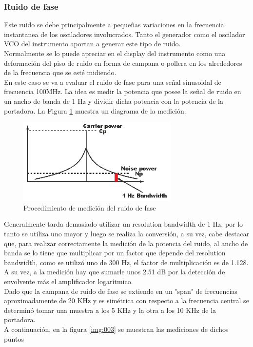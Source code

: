 \documentclass[a4paper,10pt]{article}
\begin{document}
		\subsubsection{Ruido de fase}
		\indent Este ruido se debe principalmente a peque\~nas variaciones en la frecuencia instantanea de 
		los osciladores involucrados. Tanto el generador como el oscilador VCO 
		del instrumento aportan a generar este tipo de ruido. \\
		\indent Normalmente se lo puede apreciar en el display del instrumento 
		como una deformaci\'on del piso de ruido en forma de campana o pollera 
		en los alrededores de la frecuencia que se est\'e midiendo. \\
		\indent En este caso se va a evaluar el ruido de fase para una se\~nal
		sinusoidal de frecuencia 100MHz. La idea es medir la potencia que posee 
		la se\~nal de ruido en un ancho de banda de 1 Hz y dividir dicha 
		potencia con la potencia de la portadora. La Figura \ref{img:002} 
		muestra un diagrama de la medici\'on. 

		\begin{figure}[!htb]
			\centering
			\includegraphics[width=8cm]
			{Imagenes/PhaseNoiseMeasurement.png}
			\caption{Procedimiento de medici\'on del ruido de fase}
			\label{img:002} 
		\end{figure}

		\indent Generalmente tarda demasiado utilizar un resolution bandwidth de
		1 Hz, por lo tanto se utiliza uno mayor y luego se realiza la 
		conversi\'on, a su vez, cabe destacar que, para realizar correctamente 
		la medici\'on de la potencia del ruido, al ancho de banda se lo tiene 
		que multiplicar por un factor que depende del resolution bandwidth, como
		se utiliz\'o uno de 300 Hz, el factor de multiplicaci\'on es de 1.128.\\
		\indent A su vez, a la medici\'on hay que sumarle unos 2.51 dB por la 
		detecci\'on de envolvente m\'as el amplificador logar\'itmico.  \\
		\indent Dado que la campana de ruido de fase se extiende en un "span" de
		frecuencias aproximadamente de 20 KHz y es sim\'etrica con respecto a la
		frecuencia central se determin\'o tomar una muestra a los 5 KHz y la 
		otra a los 10 KHz de la portadora. \\
		\indent A continuaci\'on, en la figura \ref{img:003} se muestran las 
		mediciones de dichos puntos 
		
\end{document}
